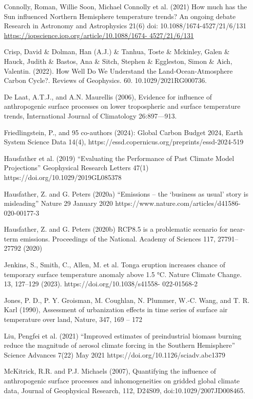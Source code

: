 \documentclass[12pt,paper=a4,DIV=12,parskip=never,chapterprefix=false,headings=standardclasses]{scrreprt}
\begin{document}
Connolly, Roman, Willie Soon, Michael Connolly et al. (2021) How much has the Sun influenced
Northern Hemisphere temperature trends? An ongoing debate Research in Astronomy and
Astrophysics 21(6) doi: 10.1088/1674-4527/21/6/131 \url{https://iopscience.iop.org/article/10.1088/1674-
4527/21/6/131}

Crisp, David \& Dolman, Han (A.J.) \& Tanhua, Toste \& Mckinley, Galen \& Hauck, Judith \& Bastos, Ana
\& Sitch, Stephen \& Eggleston, Simon \& Aich, Valentin. (2022). How Well Do We Understand the
Land‐Ocean‐Atmosphere Carbon Cycle?. Reviews of Geophysics. 60. 10.1029/2021RG000736.

De Laat, A.T.J., and A.N. Maurellis (2006), Evidence for influence of anthropogenic surface processes on
lower tropospheric and surface temperature trends, International Journal of Climatology 26:897—913.

Friedlingstein, P., and 95 co-authors (2024): Global Carbon Budget 2024, Earth System Science Data
14(4), https://essd.copernicus.org/preprints/essd-2024-519

Hausfather et al. (2019) “Evaluating the Performance of Past Climate Model Projections” Geophysical
Research Letters 47(1) https://doi.org/10.1029/2019GL085378

Hausfather, Z. and G. Peters (2020a) “Emissions – the ‘business as usual’ story is misleading” Nature 29
January 2020 https://www.nature.com/articles/d41586-020-00177-3

Hausfather, Z. and G. Peters (2020b) RCP8.5 is a problematic scenario for near-term emissions.
Proceedings of the National. Academy of Sciences 117, 27791–27792 (2020)

Jenkins, S., Smith, C., Allen, M. et al. Tonga eruption increases chance of temporary surface temperature
anomaly above 1.5 °C. Nature Climate Change. 13, 127–129 (2023). https://doi.org/10.1038/s41558-
022-01568-2

Jones, P. D., P. Y. Groisman, M. Coughlan, N. Plummer, W.-C. Wang, and T. R. Karl (1990),
Assessment of urbanization effects in time series of surface air temperature over land, Nature, 347,
169 – 172

Liu, Pengfei et al. (2021) “Improved estimates of preindustrial biomass burning reduce the magnitude of
aerosol climate forcing in the Southern Hemisphere” Science Advances 7(22) May 2021
https://doi.org/10.1126/sciadv.abc1379

McKitrick, R.R. and P.J. Michaels (2007), Quantifying the influence of anthropogenic surface processes
and inhomogeneities on gridded global climate data, Journal of Geophysical Research, 112, D24S09,
doi:10.1029/2007JD008465.
\end{document}

